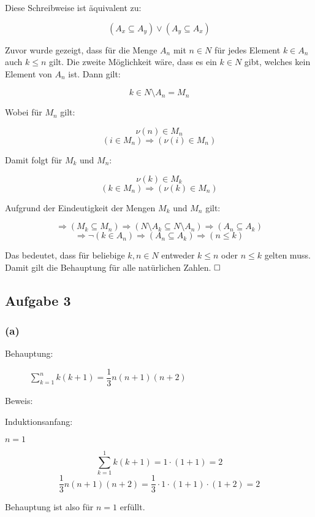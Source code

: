 \documentclass[11pt, a4paper]{article}
\begin{document}
		Diese Schreibweise ist äquivalent zu:

		\[ (A_x \subseteq A_y) \vee (A_y \subseteq A_x) \]

		Zuvor wurde gezeigt, dass für die Menge $A_n$ mit $n \in N$ für jedes Element $k \in A_n$ auch $k \leq n$ gilt.
		Die zweite Möglichkeit wäre, dass es ein $k \in N$ gibt, welches kein Element von $A_n$ ist. Dann gilt:

		\[ k \in N\setminus A_n = M_n \]

		Wobei für $M_n$ gilt:

		\[ \nu(n) \in M_n \]
		\[ (i \in M_n) \Rightarrow (\nu(i) \in M_n) \]

		Damit folgt für $M_k$ und $M_n$:

		\[ \nu(k) \in M_k \]
		\[ (k \in M_n) \Rightarrow (\nu(k) \in M_n) \]

		Aufgrund der Eindeutigkeit der Mengen $M_k$ und $M_n$ gilt:

		\[ \Rightarrow (M_k \subseteq M_n) \Rightarrow (N\setminus A_k \subseteq N\setminus A_n) \Rightarrow (A_n \subseteq A_k) \]
		\[ \Rightarrow \neg(k \in A_n) \Rightarrow (A_n \subseteq A_k) \Rightarrow (n \leq k) \]

		Das bedeutet, dass für beliebige $k,n \in N$ entweder $k \leq n$ oder $n \leq k$ gelten muss. Damit gilt die Behauptung für alle natürlichen Zahlen. $\hfill \Box$ 
		

	\subsection*{Aufgabe 3}

	\subsubsection*{(a)}

		\begin{description}
			\item[Behauptung:] $\sum_{k=1}^n k(k+1) = \dfrac{1}{3} n(n+1)(n+2)$
			\item[Beweis:]
		\end{description}

		Induktionsanfang: 

		$n=1$

		\[ \sum_{k=1}^1 k(k+1) = 1\cdot(1+1) = 2 \]
		\[ \dfrac{1}{3} n(n+1)(n+2) = \dfrac{1}{3} \cdot 1\cdot (1+1) \cdot (1+2) = 2 \]

		Behauptung ist also für $n=1$ erfüllt. \\
\end{document}

